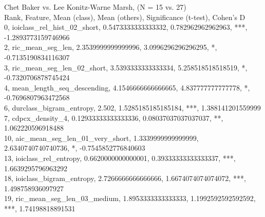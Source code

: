 Chet Baker vs. Lee Konitz-Warne Marsh, (N = 15 vs. 27)\\
Rank, Feature, Mean (class), Mean (others), Significance (t-test), Cohen's D\\
0, ioiclass_rel_hist_02_short, 0.5473333333333332, 0.782962962962963, ***, -1.2893773159746966\\
2, ric_mean_seg_len, 2.3539999999999996, 3.0996296296296295, *, -0.7135190834116307\\
3, ric_mean_seg_len_02_short, 3.5393333333333334, 5.258518518518519, *, -0.7320706878745424\\
4, mean_length_seq_descending, 4.1546666666666665, 4.837777777777778, *, -0.7696807963472568\\
6, durclass_bigram_entropy, 2.502, 1.5285185185185184, ***, 1.388141201559999\\
7, cdpcx_density_4, 0.12933333333333336, 0.08037037037037037, **, 1.062220596918488\\
10, aic_mean_seg_len_01_very_short, 1.3339999999999999, 2.6340740740740736, *, -0.7545852776840603\\
13, ioiclass_rel_entropy, 0.6620000000000001, 0.39333333333333337, ***, 1.6639295796963292\\
18, ioiclass_bigram_entropy, 2.7266666666666666, 1.6674074074074072, ***, 1.498758936097927\\
19, ric_mean_seg_len_03_medium, 1.8953333333333333, 1.1992592592592592, ***, 1.74198818891531\\
